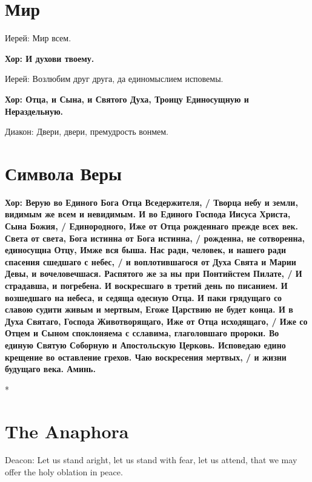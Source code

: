 \documentclass[12pt,a4paper,titlepage]{report}
\begin{document}
\begin{paracol}[1]{2}
	\switchcolumn[1]
	
	\section*{Мир}
	
	Иерей: Мир всем.
	
	\textbf{Хор: И духови твоему.}
	
	Иерей: Возлюбим друг друга, да единомыслием исповемы.
	
	\textbf{Хор: Отца, и Сына, и Святого Духа, Троицу Единосущную и Нераздельную.}
	
	Диакон: Двери, двери, премудрость вонмем.
	
	\section*{Символа Веры}
	
	\textbf{Хор: Верую во Единого Бога Отца Вседержителя, / Творца небу и земли, видимым же всем и невидимым.
		И во Единого Господа Иисуса Христа, Сына Божия, / Единородного, Иже от Отца рожденнаго прежде всех век.
		Света от света, Бога истинна от Бога истинна, / рожденна, не сотворенна, единосущна Отцу, Имже вся быша.
		Нас ради, человек, и нашего ради спасения сшедшаго с небес, / и воплотившагося от Духа Свята и Марии Девы, и вочеловечшася.
		Распятого же за ны при Понтийстем Пилате, / И страдавша, и погребена. И воскресшаго в третий день по писанием.
		И возшедшаго на небеса, и седяща одесную Отца. И паки грядущаго со славою судити живым и мертвым, Егоже Царствию не будет конца.
		И в Духа Святаго, Господа Животворящаго, Иже от Отца исходящаго, / Иже со Отцем и Сыном споклоняема с сславима, глаголовшаго пророки.
		Во единую Святую Соборную и Апостольскую Церковь. Исповедаю едино крещение во оставление грехов.
	Чаю воскресения мертвых, / и жизни будущаго века. Аминь.}
	
	\switchcolumn[0]*
	
	\section*{The Anaphora}
	
	Deacon: Let us stand aright, let us stand with fear, let us attend, that we may offer the holy oblation in peace.
	

\end{paracol}
\end{document}
